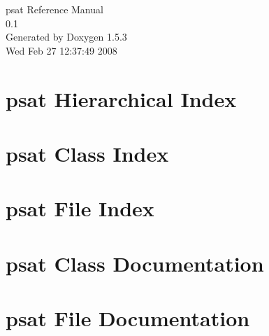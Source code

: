 \documentclass[a4paper]{book}
\begin{document}
\begin{titlepage}
\vspace*{7cm}
\begin{center}
{\Large psat Reference Manual\\[1ex]\large 0.1 }\\
\vspace*{1cm}
{\large Generated by Doxygen 1.5.3}\\
\vspace*{0.5cm}
{\small Wed Feb 27 12:37:49 2008}\\
\end{center}
\end{titlepage}
\clearemptydoublepage
{}
\tableofcontents
\clearemptydoublepage
{}
\chapter{psat Hierarchical Index}

\chapter{psat Class Index}

\chapter{psat File Index}

\chapter{psat Class Documentation}







\chapter{psat File Documentation}









\printindex
\end{document}
